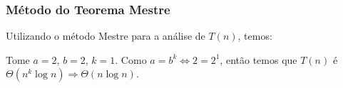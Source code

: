 \subsubsection{Método do Teorema Mestre}
Utilizando o método Mestre para a análise de $T(n)$, temos:

Tome \( a = 2 \), \( b = 2 \), \( k = 1 \). Como \( a = b^k \Leftrightarrow 2 = 2^1 \), então temos que \( T(n) \) é \( \Theta(n^k \log{n}) \Rightarrow \Theta(n \log{n}) \).

